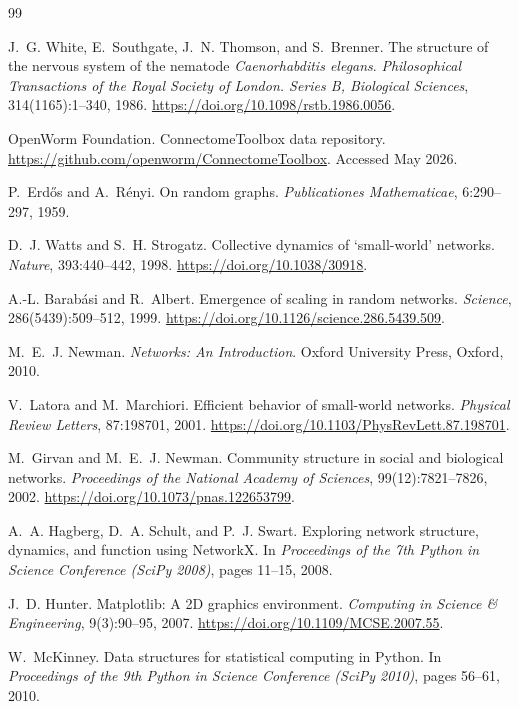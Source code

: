 \documentclass[12pt,a4paper]{report}
\begin{document}
\begin{thebibliography}{99}

J.~G. White, E.~Southgate, J.~N. Thomson, and S.~Brenner.
\newblock The structure of the nervous system of the nematode \textit{Caenorhabditis elegans}.
\newblock \textit{Philosophical Transactions of the Royal Society of London. Series B, Biological Sciences}, 314(1165):1--340, 1986.
\newblock \url{https://doi.org/10.1098/rstb.1986.0056}.

OpenWorm Foundation.
\newblock ConnectomeToolbox data repository.
\newblock \url{https://github.com/openworm/ConnectomeToolbox}. Accessed May 2026.

P.~Erd\H{o}s and A.~R\'{e}nyi.
\newblock On random graphs.
\newblock \textit{Publicationes Mathematicae}, 6:290--297, 1959.

D.~J. Watts and S.~H. Strogatz.
\newblock Collective dynamics of `small-world' networks.
\newblock \textit{Nature}, 393:440--442, 1998.
\newblock \url{https://doi.org/10.1038/30918}.

A.-L. Barab\'{a}si and R.~Albert.
\newblock Emergence of scaling in random networks.
\newblock \textit{Science}, 286(5439):509--512, 1999.
\newblock \url{https://doi.org/10.1126/science.286.5439.509}.

M.~E.~J. Newman.
\newblock \textit{Networks: An Introduction}.
\newblock Oxford University Press, Oxford, 2010.

V.~Latora and M.~Marchiori.
\newblock Efficient behavior of small-world networks.
\newblock \textit{Physical Review Letters}, 87:198701, 2001.
\newblock \url{https://doi.org/10.1103/PhysRevLett.87.198701}.

M.~Girvan and M.~E.~J. Newman.
\newblock Community structure in social and biological networks.
\newblock \textit{Proceedings of the National Academy of Sciences}, 99(12):7821--7826, 2002.
\newblock \url{https://doi.org/10.1073/pnas.122653799}.

A.~A. Hagberg, D.~A. Schult, and P.~J. Swart.
\newblock Exploring network structure, dynamics, and function using NetworkX.
\newblock In \textit{Proceedings of the 7th Python in Science Conference (SciPy 2008)}, pages 11--15, 2008.

J.~D. Hunter.
\newblock Matplotlib: A 2D graphics environment.
\newblock \textit{Computing in Science \& Engineering}, 9(3):90--95, 2007.
\newblock \url{https://doi.org/10.1109/MCSE.2007.55}.

W.~McKinney.
\newblock Data structures for statistical computing in Python.
\newblock In \textit{Proceedings of the 9th Python in Science Conference (SciPy 2010)}, pages 56--61, 2010.

\end{thebibliography}
\end{document}
